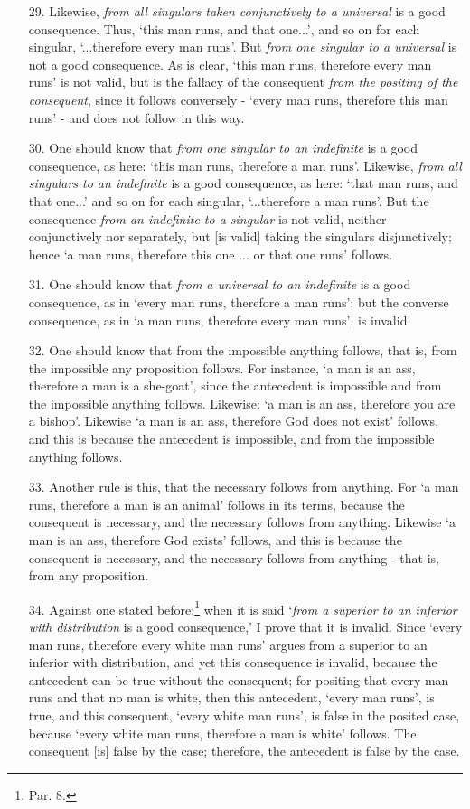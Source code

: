 \begin{enumerate}
\item[29.] Likewise, \textit{from all singulars taken conjunctively to a universal} is a good consequence. Thus, `this man runs, and that one...', and so on for each singular, `...therefore every man runs'. But \textit{from one singular to a universal} is not a good consequence. As is clear, `this man runs, therefore every man runs' is not valid, but is the fallacy of the consequent \textit{from the positing of the consequent}, since it follows conversely - `every man runs, therefore this man runs' - and does not follow in this way.
\item[30.] One should know that \textit{from one singular to an indefinite} is a good consequence, as here: `this man runs, therefore a man runs'. Likewise, \textit{from all singulars to an indefinite} is a good consequence, as here: `that man runs, and that one...' and so on for each singular, `...therefore a man runs'. But the consequence \textit{from an indefinite to a singular} is not valid, neither conjunctively nor separately, but [is valid] taking the singulars disjunctively; hence `a man runs, therefore this one ... or that one runs' follows.
\item[31.] One should know that \textit{from a universal to an indefinite} is a good consequence, as in `every man runs, therefore a man runs'; but the converse consequence, as in `a man runs, therefore every man runs', is invalid.
\item[32.] One should know that from the impossible anything follows, that is, from the impossible any proposition follows. For instance, `a man is an ass, therefore a man is a she-goat', since the antecedent is impossible and from the impossible anything follows. Likewise: `a man is an ass, therefore you are a bishop'. Likewise `a man is an ass, therefore God does not exist' follows, and this is because the antecedent is impossible, and from the impossible anything follows. 
\item[33.] Another rule is this, that the necessary follows from anything. For `a man runs, therefore a man is an animal' follows in its terms, because the consequent is necessary, and the necessary follows from anything. Likewise `a man is an ass, therefore God exists' follows, and this is because the consequent is necessary, and the necessary follows from anything - that is, from any proposition.
\item[34.] Against one stated before:\footnote{Par. 8.} when it is said `\textit{from a superior to an inferior with distribution} is a good consequence,' I prove that it is invalid. Since `every man runs, therefore every white man runs' argues from a superior to an inferior with distribution, and yet this consequence is invalid, because the antecedent can be true without the consequent; for positing that every man runs and that no man is white, then this antecedent, `every man runs', is true, and this consequent, `every white man runs', is false in the posited case, because `every white man runs, therefore a man is white' follows. The consequent [is] false by the case; therefore, the antecedent is false by the case. 

\end{enumerate}
